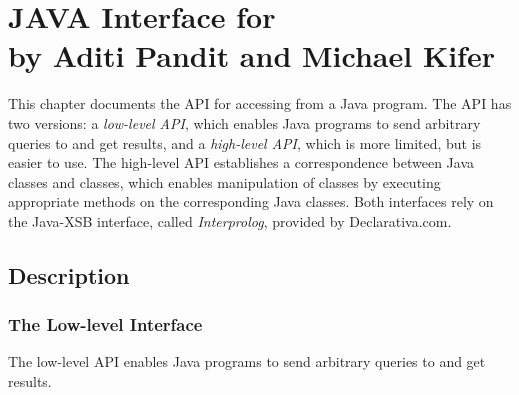 

    \chapter[JAVA Interface for \FLORA]{JAVA Interface for \FLORA\\by Aditi
      Pandit and Michael Kifer}


     This chapter documents the API for accessing \FLORA from a Java program.
  The API has two versions: a \emph{low-level API},
  which enables Java programs to
  send arbitrary queries to \FLORA and get results, and a \emph{high-level
    API}, which is more limited, but is easier to use. The high-level API
  establishes a correspondence between Java classes and \FLORA classes,
  which enables manipulation of \FLORA classes by executing appropriate
  methods on the corresponding Java classes. Both interfaces rely on the
  Java-XSB interface, called \emph{Interprolog}, provided by Declarativa.com.


\section{Description}
\subsection{The Low-level Interface}
 The low-level API enables Java programs to send arbitrary queries
to \FLORA and get results. 

